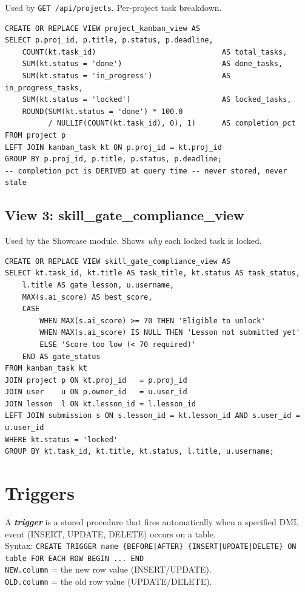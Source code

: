 \documentclass[11pt,a4paper]{article}
\newcommand{\term}[1]{\textbf{\textit{#1}}}
\newcommand{\T}[1]{\texttt{#1}}          %
\begin{document}
Used by \T{GET /api/projects}. Per-project task breakdown.

\begin{lstlisting}[style=sql]
CREATE OR REPLACE VIEW project_kanban_view AS
SELECT p.proj_id, p.title, p.status, p.deadline,
    COUNT(kt.task_id)                             AS total_tasks,
    SUM(kt.status = 'done')                       AS done_tasks,
    SUM(kt.status = 'in_progress')                AS in_progress_tasks,
    SUM(kt.status = 'locked')                     AS locked_tasks,
    ROUND(SUM(kt.status = 'done') * 100.0
          / NULLIF(COUNT(kt.task_id), 0), 1)      AS completion_pct
FROM project p
LEFT JOIN kanban_task kt ON p.proj_id = kt.proj_id
GROUP BY p.proj_id, p.title, p.status, p.deadline;
-- completion_pct is DERIVED at query time -- never stored, never stale
\end{lstlisting}

\subsection{View 3: skill\_gate\_compliance\_view}

Used by the Showcase module. Shows \textit{why} each locked task is locked.

\begin{lstlisting}[style=sql]
CREATE OR REPLACE VIEW skill_gate_compliance_view AS
SELECT kt.task_id, kt.title AS task_title, kt.status AS task_status,
    l.title AS gate_lesson, u.username,
    MAX(s.ai_score) AS best_score,
    CASE
        WHEN MAX(s.ai_score) >= 70 THEN 'Eligible to unlock'
        WHEN MAX(s.ai_score) IS NULL THEN 'Lesson not submitted yet'
        ELSE 'Score too low (< 70 required)'
    END AS gate_status
FROM kanban_task kt
JOIN project p ON kt.proj_id   = p.proj_id
JOIN user    u ON p.owner_id   = u.user_id
JOIN lesson  l ON kt.lesson_id = l.lesson_id
LEFT JOIN submission s ON s.lesson_id = kt.lesson_id AND s.user_id = u.user_id
WHERE kt.status = 'locked'
GROUP BY kt.task_id, kt.title, kt.status, l.title, u.username;
\end{lstlisting}

\section{Triggers}

\begin{defbox}
A \term{trigger} is a stored procedure that fires automatically when a specified DML
event (INSERT, UPDATE, DELETE) occurs on a table.\\[4pt]
Syntax: \T{CREATE TRIGGER name \{BEFORE|AFTER\} \{INSERT|UPDATE|DELETE\} ON table FOR
EACH ROW BEGIN ... END}\\[4pt]
\T{NEW.column} = the new row value (INSERT/UPDATE).\\
\T{OLD.column} = the old row value (UPDATE/DELETE).
\end{defbox}
\end{document}
